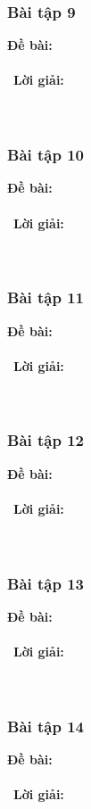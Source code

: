 \documentclass[a4paper]{article}
\begin{document}
\subsubsection{Bài tập 9}
\textbf{Đề bài:} 
\\\ \\\
\textbf{Lời giải:} \\\ \\\
\clearpage
\subsubsection{Bài tập 10}
\textbf{Đề bài:} 
\\\ \\\
\textbf{Lời giải:} \\\ \\\
\clearpage
\subsubsection{Bài tập 11}
\textbf{Đề bài:} 
\\\ \\\
\textbf{Lời giải:} \\\ \\\
\clearpage
\subsubsection{Bài tập 12}
\textbf{Đề bài:} 
\\\ \\\
\textbf{Lời giải:} \\\ \\\
\clearpage
\subsubsection{Bài tập 13}
\textbf{Đề bài:} 
\\\ \\\
\textbf{Lời giải:} \\\ \\\
\clearpage
\subsubsection{Bài tập 14}
\textbf{Đề bài:} 
\\\ \\\
\textbf{Lời giải:} \\\ \\\
\clearpage
\end{document}
